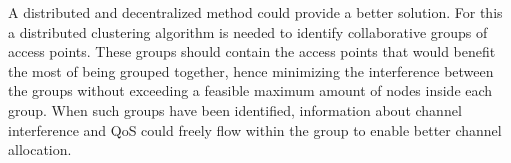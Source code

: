 A distributed and decentralized method could provide a better solution. For this a distributed clustering algorithm is needed to identify collaborative groups of access points.
These groups should contain the access points that would benefit the most of being grouped together, hence minimizing the interference between the groups 
without exceeding a feasible maximum amount of nodes inside each group. When such groups have been identified, information about channel interference and QoS could freely flow within the group
to enable better channel allocation. 









